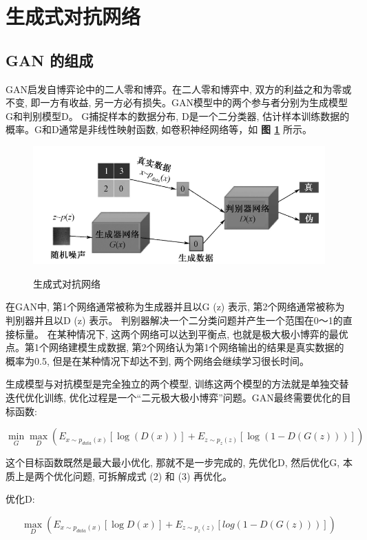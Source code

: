\section{生成式对抗网络}

\subsection{GAN 的组成}
GAN启发自博弈论中的二人零和博弈。在二人零和博弈中, 双方的利益之和为零或不变, 即一方有收益, 另一方必有损失。GAN模型中的两个参与者分别为生成模型G和判别模型D。
G捕捉样本的数据分布, D是一个二分类器, 估计样本训练数据的概率。G和D通常是非线性映射函数, 如卷积神经网络等，如 \textbf{图 \ref{fig:gan}} 所示。

\begin{figure}[h!]
	\caption{生成式对抗网络}
	\centering
	\includegraphics[width=\textwidth]{gan.png}
	\label{fig:gan}
\end{figure}


在GAN中, 第1个网络通常被称为生成器并且以G (z) 表示, 第2个网络通常被称为判别器并且以D (z) 表示。
判别器解决一个二分类问题并产生一个范围在0～1的直接标量。
在某种情况下, 这两个网络可以达到平衡点, 也就是极大极小博弈的最优点。第1个网络建模生成数据, 第2个网络认为第1个网络输出的结果是真实数据的概率为0.5, 但是在某种情况下却达不到, 两个网络会继续学习很长时间。


生成模型与对抗模型是完全独立的两个模型, 训练这两个模型的方法就是单独交替迭代优化训练, 优化过程是一个“二元极大极小博弈”问题。GAN最终需要优化的目标函数:

\begin{equation}
\min_G \max_D (E_{x \sim p_{data}(x)} [\log (D(x)) ] + E_{z \sim p_z(z)} [ \log (1 - D(G(z)))])
\end{equation}


这个目标函数既然是最大最小优化, 那就不是一步完成的, 先优化D, 然后优化G, 本质上是两个优化问题, 可拆解成式 (2) 和 (3) 再优化。


优化D:

\begin{equation}
\max_D (E_{x \sim p_{data}(x)} [ \log D(x) ] + E_{z \sim p_z(z)} [ log (1 - D(G(z)))])
\end{equation}


